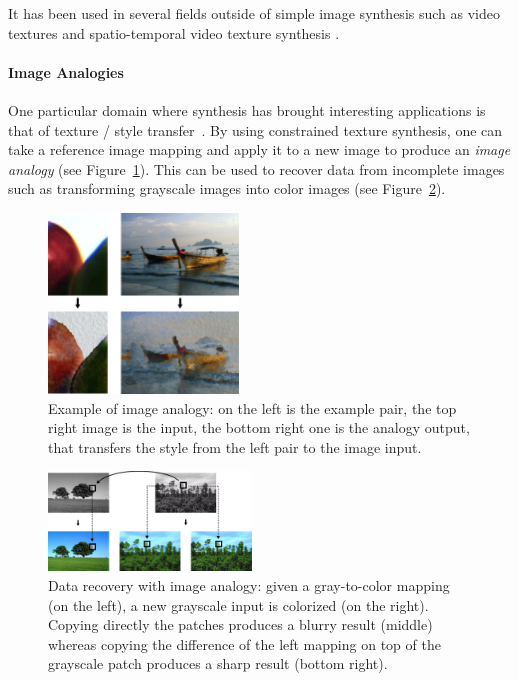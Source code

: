 It has been used in several fields outside of simple image synthesis \cite{Wei09} such as video textures \cite{Schodl00, Schodl02, Agarwala05} and spatio-temporal video texture synthesis \cite{Kwatra03, Wexler07}.

\paragraph{Image Analogies}
One particular domain where synthesis has brought interesting applications is that of texture / style transfer~\cite{Efros01, Hertzmann01}. By using constrained texture synthesis, one can take a reference image mapping and apply it to a new image to produce an \emph{image analogy} (see Figure~\ref{fig:analogies}). This can be used to recover data from incomplete images such as transforming grayscale images into color images (see Figure~\ref{fig:colorize}).

\begin{figure}[ht]
	\centering
	\includegraphics[width=0.45\textwidth]{figures/analogies}
	\caption{Example of image analogy: on the left is the example pair, the top right image is the input, the bottom right one is the analogy output, that transfers the style from the left pair to the image input.}
	\label{fig:analogies}
\end{figure}

\begin{figure}[ht]
	\centering
	\includegraphics[width=0.48\textwidth]{figures/colorization}
	\caption{Data recovery with image analogy: given a gray-to-color mapping (on the left), a new grayscale input is colorized (on the right). Copying directly the patches produces a blurry result (middle) whereas copying the difference of the left mapping on top of the grayscale patch produces a sharp result (bottom right).}
	\label{fig:colorize}
\end{figure}

